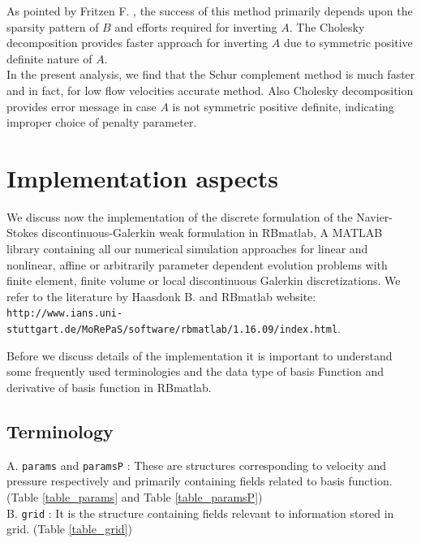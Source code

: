 \documentclass[a4paper,twoside,openright]{book}
\begin{document}
As pointed by Fritzen F. \cite{Fritzen}, the success of this method primarily depends upon the sparsity pattern of $B$ and efforts required for inverting $A$. The Cholesky decomposition provides faster approach for inverting $A$ due to symmetric positive definite nature of $A$. \\

In the present analysis, we find that the Schur complement method is much faster and in fact, for low flow velocities accurate method. Also Cholesky decomposition provides error message in case $A$ is not symmetric positive definite, indicating improper choice of penalty parameter. 

\chapter{Implementation aspects} \label{implementation_aspects}

We discuss now the implementation of the discrete formulation of the Navier-Stokes discontinuous-Galerkin weak formulation in RBmatlab, A MATLAB library containing all our numerical simulation approaches for linear and nonlinear, affine or arbitrarily parameter dependent evolution problems with finite element, finite volume or local discontinuous Galerkin discretizations. We refer to the literature by Haasdonk B.\cite{Haasdonk_book} and RBmatlab website: \\
\texttt{http://www.ians.uni-stuttgart.de/MoRePaS/software/rbmatlab/1.16.09/\linebreak index.html}.  

Before we discuss details of the implementation it is important to understand some frequently used terminologies and the data type of basis Function and derivative of basis function in RBmatlab.

\section{Terminology}

A. \verb|params| and \verb|paramsP| : These are structures corresponding to velocity and pressure respectively and primarily containing fields related to basis function. (Table \ref{table_params} and Table \ref{table_paramsP})\\

B. \verb|grid| : It is the structure containing fields relevant to information stored in grid. (Table \ref{table_grid})\\
\end{document}
